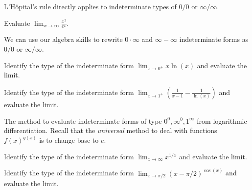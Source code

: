 \documentclass[../main.tex]{subfiles}
\begin{document}
  L'H\^opital's rule directly applies to indeterminate types of \(0/0\) or \(\infty/\infty\).
  \begin{example}
    Evaluate \(\lim_{x \to \infty} \frac{x^{2}}{e^{x}}\).
  \end{example}

  
  \clearpage

  We can use our algebra skills to rewrite \(0 \cdot \infty\) and \(\infty - \infty\) indeterminate forms as \(0/0\) or \(\infty/\infty\).
  \begin{example}
    Identify the type of the indeterminate form  \(\lim_{x \to 0^{+}} x \ln(x)\) and evaluate the limit.
  \end{example}

  \begin{example}
    Identify the type of the indeterminate form  \(\lim_{x \to 1^{+}} \left(\frac{1}{x-1} - \frac{1}{\ln(x)}\right)\) and evaluate the limit.
  \end{example}

  The method to evaluate indeterminate forms of type \(0^{0}, \infty^{0}, 1^{\infty}\)  from logarithmic differentiation. Recall that the \emph{universal} method to deal with functions \(f(x)^{g(x)}\) is to change base to \(e\).
  \begin{example}
    Identify the type of the indeterminate form \(\lim_{x \to \infty} x^{1/x}\) and evaluate the limit.
  \end{example}
  \clearpage

  \begin{example}
      Identify the type of the indeterminate form \(\lim_{x \to \pi/2} (x - \pi/2)^{\cos(x)}\) and evaluate the limit.
  \end{example}
\end{document}
